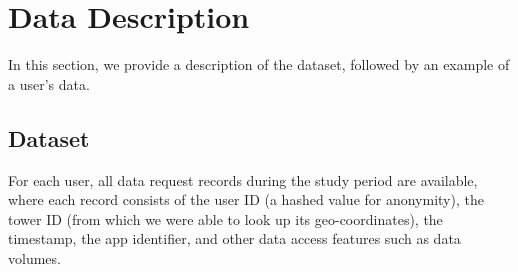\section{Data Description}\label{data}

In this section, we provide a description of the dataset,
followed by an example of a user's data.

\subsection{Dataset}

For each user, all data request records during the study period are available,
where each record consists of the user ID (a hashed value for anonymity), 
the tower ID (from which we were able to look up its geo-coordinates), 
the timestamp, 
the app identifier, 
and other data access features such as data volumes.



